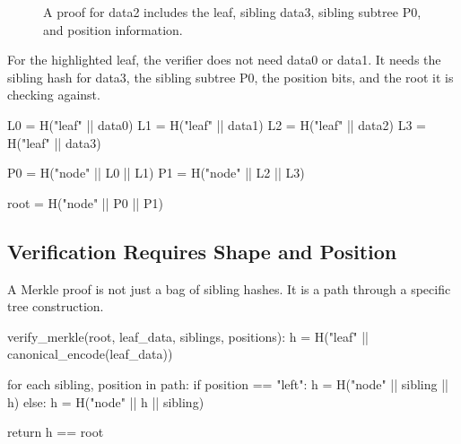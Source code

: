 \begin{figure}[htbp]
\centering
{}
\caption{A proof for data2 includes the leaf, sibling data3, sibling subtree P0, and position information.}
\end{figure}

For the highlighted leaf, the verifier does not need data0 or data1. It needs the sibling hash for data3, the sibling subtree P0, the position bits, and the root it is checking against.

\begin{codeblock}
L0 = H("leaf" || data0)
L1 = H("leaf" || data1)
L2 = H("leaf" || data2)
L3 = H("leaf" || data3)

P0 = H("node" || L0 || L1)
P1 = H("node" || L2 || L3)

root = H("node" || P0 || P1)
\end{codeblock}

\subsection{Verification Requires Shape and Position}

A Merkle proof is not just a bag of sibling hashes. It is a path through a specific tree construction.

\begin{codeblock}
verify_merkle(root, leaf_data, siblings, positions):
    h = H("leaf" || canonical_encode(leaf_data))

    for each sibling, position in path:
        if position == "left":
            h = H("node" || sibling || h)
        else:
            h = H("node" || h || sibling)

    return h == root
\end{codeblock}

